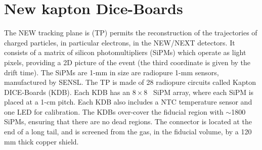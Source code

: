 
\section{New kapton Dice-Boards}
The NEW tracking plane is (TP) permits the reconstruction of the trajectories of charged particles, in particular electrons, in the NEW/NEXT detectors. It consists of a matrix of silicon photomultipliers (SiPMs) which operate as light pixels, providing a 2D picture of the event (the third coordinate is given by the drift time). The SiPMs are 1-mm in size are radiopure 1-mm sensors, manufactured by SENSL. The TP is made of 28 radiopure circuits called Kapton DICE-Boards (KDB). Each KDB has an $8\times8$~ SiPM array, where each SiPM is placed at a 1-cm pitch. Each KDB also includes a NTC temperature sensor and one LED for calibration. The KDBs over-cover the fiducial region with $\sim$1800 SiPMs, ensuring that there are no dead regions. The connector is located at the end of a long tail, and is screened from the gas, in the fiducial volume, by a 120 mm thick copper shield.


